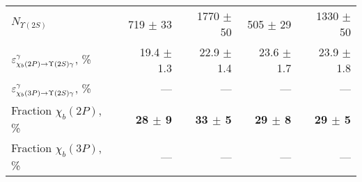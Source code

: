 \begin{table}[H]
{{\begin{tabular}{lrrrr}
\rule{0pt}{4ex}$N_{\Upsilon(2S)}$ & 719 $\pm$ 33 & 1770 $\pm$ 50 & 505 $\pm$ 29 & 1330 $\pm$ 50\\

\rule{0pt}{4ex}$\varepsilon_{\chi_b(2P) \rightarrow \Upsilon(2S) \gamma}^{\gamma}$, \% & 19.4 $\pm$ 1.3 & 22.9 $\pm$ 1.4 & 23.6 $\pm$ 1.7 & 23.9 $\pm$ 1.8\\
$\varepsilon_{\chi_b(3P) \rightarrow \Upsilon(2S) \gamma}^{\gamma}$, \% & --- & --- & --- & ---\\
\midrule
Fraction $\chi_b(2P)$, \% & \textbf{28 $\pm$ 9} & \textbf{33 $\pm$ 5} & \textbf{29 $\pm$ 8} & \textbf{29 $\pm$ 5}\\
Fraction $\chi_b(3P)$, \% & --- & --- & --- & ---\\
\bottomrule
\end{tabular}
} %

} %
\label{tab:frac:ups2s}
\end{table}

\begin{table}[H]
\caption{\small Summary of \Y3S fraction determination originating from \chib decay}
\centering
{} %
\label{tab:frac:ups3s}
\end{table}